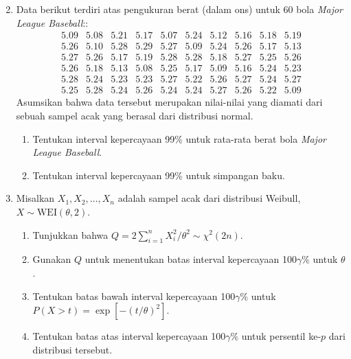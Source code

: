 \documentclass{exam}
\begin{document}

\begin{enumerate}
    \setcounter{enumi}{1}
    \item Data berikut terdiri atas pengukuran berat (dalam ons) untuk 60 bola \textit{Major League Baseball}::
    \[
    \begin{array}{llllllllll}
    5.09 & 5.08 & 5.21 & 5.17 & 5.07 & 5.24 & 5.12 & 5.16 & 5.18 & 5.19 \\
    5.26 & 5.10 & 5.28 & 5.29 & 5.27 & 5.09 & 5.24 & 5.26 & 5.17 & 5.13 \\
    5.27 & 5.26 & 5.17 & 5.19 & 5.28 & 5.28 & 5.18 & 5.27 & 5.25 & 5.26 \\
    5.26 & 5.18 & 5.13 & 5.08 & 5.25 & 5.17 & 5.09 & 5.16 & 5.24 & 5.23 \\
    5.28 & 5.24 & 5.23 & 5.23 & 5.27 & 5.22 & 5.26 & 5.27 & 5.24 & 5.27 \\
    5.25 & 5.28 & 5.24 & 5.26 & 5.24 & 5.24 & 5.27 & 5.26 & 5.22 & 5.09
    \end{array}
    \]
    Asumsikan bahwa data tersebut merupakan nilai-nilai yang diamati dari sebuah sampel acak yang berasal dari distribusi normal.
    \begin{enumerate}
        \item Tentukan interval kepercayaan 99\% untuk rata-rata berat bola \textit{Major League Baseball}.
        \item Tentukan interval kepercayaan 99\% untuk simpangan baku.
    \end{enumerate}
    \setcounter{enumi}{6}
    \item Misalkan \( X_1, X_2, \ldots, X_n \) adalah sampel acak dari distribusi Weibull, \( X \sim \text{WEI}(\theta, 2) \).
    \begin{enumerate}
        \item Tunjukkan bahwa $\displaystyle Q = 2 \sum_{i=1}^n X_i^2/\theta^2 \sim \chi^2(2n)$.
        \item Gunakan \( Q \) untuk menentukan batas interval kepercayaan 100\( \gamma\% \) untuk \( \theta \).
        \item Tentukan batas bawah interval kepercayaan 100\( \gamma\% \) untuk $P(X > t) = \exp\left[-(t/\theta)^2\right]$.
        \item Tentukan batas atas interval kepercayaan 100\( \gamma\% \) untuk persentil ke-\( p \) dari distribusi tersebut.
    \end{enumerate}
    \begin{solution}
        \begin{enumerate}

\end{enumerate}
\end{solution}
\end{enumerate}
\end{document}
